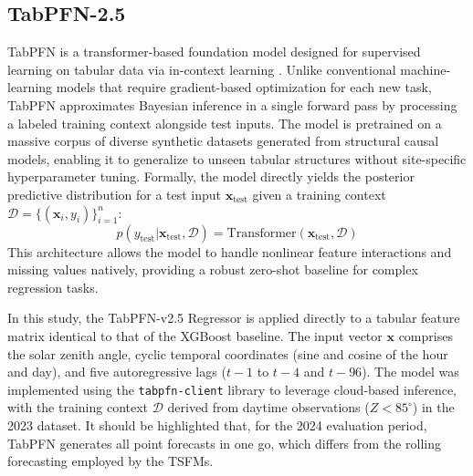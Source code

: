 \documentclass[number, 3p, 10pt, times]{elsarticle}
\begin{document}
\subsection{TabPFN-2.5}
TabPFN is a transformer-based foundation model designed for supervised learning on tabular data via in-context learning \citep{Hollmann2025}. Unlike conventional machine-learning models that require gradient-based optimization for each new task, TabPFN approximates Bayesian inference in a single forward pass by processing a labeled training context alongside test inputs. The model is pretrained on a massive corpus of diverse synthetic datasets generated from structural causal models, enabling it to generalize to unseen tabular structures without site-specific hyperparameter tuning. Formally, the model directly yields the posterior predictive distribution for a test input $\mathbf{x}_\text{test}$ given a training context $\mathcal{D} = \{(\mathbf{x}_i, y_i)\}_{i=1}^n$:
\begin{equation}
    p(y_\text{test} | \mathbf{x}_\text{test}, \mathcal{D}) = \text{Transformer}(\mathbf{x}_\text{test}, \mathcal{D})
\end{equation}
This architecture allows the model to handle nonlinear feature interactions and missing values natively, providing a robust zero-shot baseline for complex regression tasks.

In this study, the TabPFN-v2.5 Regressor is applied directly to a tabular feature matrix identical to that of the XGBoost baseline. The input vector $\mathbf{x}$ comprises the solar zenith angle, cyclic temporal coordinates (sine and cosine of the hour and day), and five autoregressive lags ($t-1$ to $t-4$ and $t-96$). The model was implemented using the \texttt{tabpfn-client} library to leverage cloud-based inference, with the training context $\mathcal{D}$ derived from daytime observations ($Z < 85^\circ$) in the 2023 dataset. It should be highlighted that, for the 2024 evaluation period, TabPFN generates all point forecasts in one go, which differs from the rolling forecasting employed by the TSFMs. 
\end{document}

